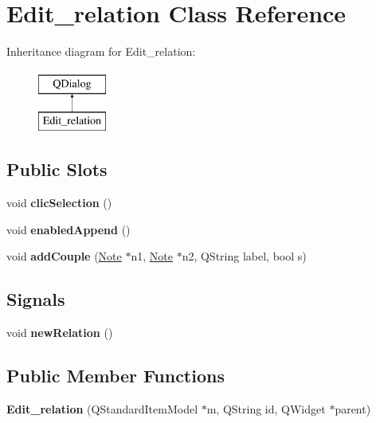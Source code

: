 \hypertarget{class_edit__relation}{}\section{Edit\+\_\+relation Class Reference}
\label{class_edit__relation}
Inheritance diagram for Edit\+\_\+relation\+:\begin{figure}[H]
\begin{center}
\leavevmode
\includegraphics[height=2.000000cm]{class_edit__relation}
\end{center}
\end{figure}
\subsection*{Public Slots}
\begin{DoxyCompactItemize}
\item 
\mbox{\label{class_edit__relation_ab8b401c68bf851bea39fc38fbce0f9f5}} 
void {\bfseries clic\+Selection} ()
\item 
\mbox{\label{class_edit__relation_a558f8134fbd20281e24ceb350882ddaf}} 
void {\bfseries enabled\+Append} ()
\item 
\mbox{\label{class_edit__relation_a06254b8a5265ba82160c6ab62bbf9101}} 
void {\bfseries add\+Couple} (\hyperlink{class_note}{Note} $\ast$n1, \hyperlink{class_note}{Note} $\ast$n2, Q\+String label, bool s)
\end{DoxyCompactItemize}
\subsection*{Signals}
\begin{DoxyCompactItemize}
\item 
\mbox{\label{class_edit__relation_a39ece696a8813495b806fcd5cc8ec51c}} 
void {\bfseries new\+Relation} ()
\end{DoxyCompactItemize}
\subsection*{Public Member Functions}
\begin{DoxyCompactItemize}
\item 
\mbox{\label{class_edit__relation_aea8577d292461d142c4087fd5446a48c}} 
{\bfseries Edit\+\_\+relation} (Q\+Standard\+Item\+Model $\ast$m, Q\+String id, Q\+Widget $\ast$parent)
\end{DoxyCompactItemize}


